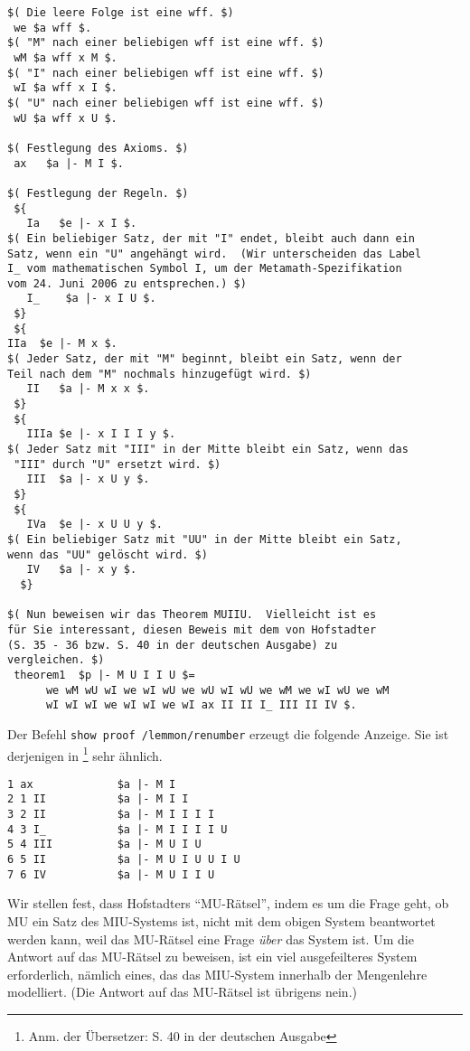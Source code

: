 \begin{verbatim}
$( Die leere Folge ist eine wff. $)
 we $a wff $.
$( "M" nach einer beliebigen wff ist eine wff. $)
 wM $a wff x M $.
$( "I" nach einer beliebigen wff ist eine wff. $)
 wI $a wff x I $.
$( "U" nach einer beliebigen wff ist eine wff. $)
 wU $a wff x U $.

$( Festlegung des Axioms. $)
 ax   $a |- M I $.

$( Festlegung der Regeln. $)
 ${
   Ia   $e |- x I $.
$( Ein beliebiger Satz, der mit "I" endet, bleibt auch dann ein
Satz, wenn ein "U" angehängt wird.  (Wir unterscheiden das Label
I_ vom mathematischen Symbol I, um der Metamath-Spezifikation
vom 24. Juni 2006 zu entsprechen.) $) 
   I_    $a |- x I U $.
 $}
 ${
IIa  $e |- M x $.
$( Jeder Satz, der mit "M" beginnt, bleibt ein Satz, wenn der
Teil nach dem "M" nochmals hinzugefügt wird. $) 
   II   $a |- M x x $.
 $}
 ${
   IIIa $e |- x I I I y $.
$( Jeder Satz mit "III" in der Mitte bleibt ein Satz, wenn das
 "III" durch "U" ersetzt wird. $) 
   III  $a |- x U y $.
 $}
 ${
   IVa  $e |- x U U y $.
$( Ein beliebiger Satz mit "UU" in der Mitte bleibt ein Satz,
wenn das "UU" gelöscht wird. $) 
   IV   $a |- x y $.
  $}

$( Nun beweisen wir das Theorem MUIIU.  Vielleicht ist es
für Sie interessant, diesen Beweis mit dem von Hofstadter
(S. 35 - 36 bzw. S. 40 in der deutschen Ausgabe) zu
vergleichen. $) 
 theorem1  $p |- M U I I U $=
      we wM wU wI we wI wU we wU wI wU we wM we wI wU we wM
      wI wI wI we wI wI we wI ax II II I_ III II IV $.
\end{verbatim}

Der Befehl \texttt{show proof /lemmon/renumber} erzeugt die folgende Anzeige.  Sie ist derjenigen in \cite[S.~35--36]{Hofstadter}\footnote{Anm. der Übersetzer: S. 40 in der deutschen Ausgabe} sehr ähnlich. 

\begin{verbatim}
1 ax             $a |- M I
2 1 II           $a |- M I I
3 2 II           $a |- M I I I I
4 3 I_           $a |- M I I I I U
5 4 III          $a |- M U I U
6 5 II           $a |- M U I U U I U
7 6 IV           $a |- M U I I U
\end{verbatim}

Wir stellen fest, dass Hofstadters "`MU-Rätsel"', indem es um die Frage geht, ob MU ein Satz des MIU-Systems ist, nicht mit dem obigen System beantwortet werden kann, weil das MU-Rätsel eine Frage {\em über} das System ist.  Um die Antwort auf das MU-Rätsel zu beweisen, ist ein viel ausgefeilteres System erforderlich, nämlich eines, das das MIU-System innerhalb der Mengenlehre modelliert.  (Die Antwort auf das MU-Rätsel ist übrigens nein.) 


